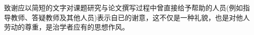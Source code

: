 \neeputanks%
\bodystyle%
致谢应以简短的文字对课题研究与论文撰写过程中曾直接给予帮助的人员(例如指导教师、答疑教师及其他人员)表示自已的谢意，这不仅是一种礼貌，也是对他人劳动的尊重，是治学者应有的思想作风。\par